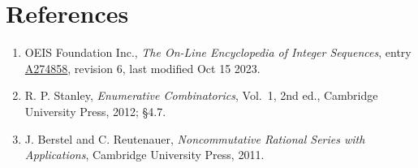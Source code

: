 \documentclass[11pt]{article}
\theoremstyle{definition}
\begin{document}
\section{References}

\begin{enumerate}

\item OEIS Foundation Inc., \emph{The On-Line Encyclopedia of Integer Sequences}, entry \href{https://oeis.org/A274858}{A274858}, revision 6, last modified Oct 15 2023.

\item R. P. Stanley, \emph{Enumerative Combinatorics}, Vol.~1, 2nd ed., Cambridge University Press, 2012; \S4.7.

\item J. Berstel and C. Reutenauer, \emph{Noncommutative Rational Series with Applications}, Cambridge University Press, 2011.

\end{enumerate}
\end{document}
